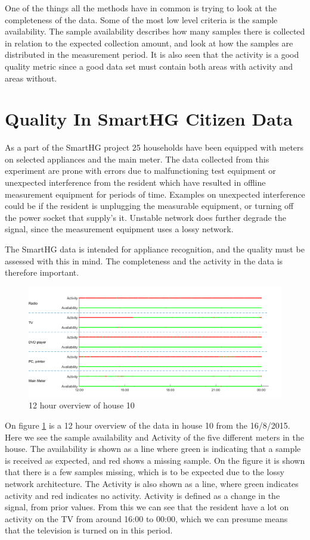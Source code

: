 One of the things all the methods have in common is trying to look at the completeness of the data. Some of the most low level criteria is the sample availability. The sample availability describes how many samples there is collected in relation to the expected collection amount, and look at how the samples are distributed in the measurement period. It is also seen that the activity is a good quality metric since a good data set must contain both areas with activity and areas without. 

\section{Quality In SmartHG Citizen Data}
As a part of the SmartHG project 25 households have been equipped with meters on selected appliances and the main meter. The data collected from this experiment are prone with errors due to malfunctioning test equipment or unexpected interference from the resident which have resulted in offline measurement equipment for periods of time. Examples on unexpected interference could be if the resident is unplugging the measurable equipment, or turning off the power socket that supply's it. Unstable network does further degrade the signal, since the measurement equipment uses a lossy network. 

The SmartHG data is intended for appliance recognition, and the quality must be assessed with this in mind. The completeness and the activity in the data is therefore important. 

\begin{figure}[H]
\centering
\includegraphics[width=1\textwidth]{billeder/Test.png}
\caption{12 hour overview of house 10}
\label{fig:12HRes}
\end{figure}

On figure \ref{fig:12HRes} is a 12 hour overview of the data in house 10 from the 16/8/2015. Here we see the sample availability and Activity of the five different meters in the house. The availability is shown as a line where green is indicating that a sample is received as expected, and red shows a missing sample. On the figure it is shown that there is a few samples missing, which is to be expected due to the lossy network architecture. The Activity is also shown as a line, where green indicates activity and red indicates no activity. Activity is defined as a change in the signal, from prior values. From this we can see that the resident have a lot on activity on the TV from around 16:00 to 00:00, which we can presume means that the television is turned on in this period. 

